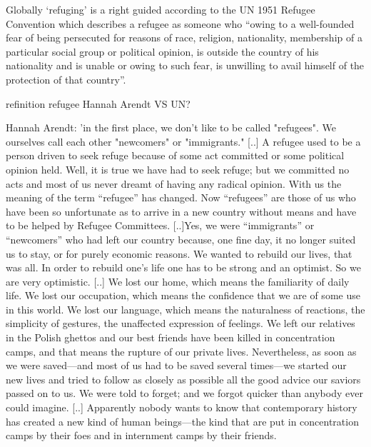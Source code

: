 Globally ‘refuging’ is a right guided according to the UN
1951 Refugee Convention which describes a refugee as
someone who “owing to a well-founded fear of being
persecuted for reasons of race, religion, nationality,
membership of a particular social group or political
opinion, is outside the country of his nationality and is
unable or owing to such fear, is unwilling to avail himself
of the protection of that country”.


refinition refugee Hannah Arendt VS UN?

Hannah Arendt: 'in the first place, we don't like to be called "refugees". We ourselves call each other "newcomers" or "immigrants." [..] A refugee used to be a person driven to seek refuge because of some act committed or some political opinion held. Well, it is true we have had to seek refuge; but we committed no acts and most of us never dreamt of having any radical opinion. With us the meaning of the term “refugee” has changed. Now “refugees” are those of us who have been so unfortunate as to arrive in a new country without means and have to be helped by Refugee Committees.
[..]Yes, we were “immigrants” or “newcomers” who had left our country because, one fine day, it no longer suited us to stay, or for purely economic reasons. We wanted to rebuild our lives, that was all. In order to rebuild one’s life one has to be strong and an optimist. So we are very optimistic. [..]
We lost our home, which means the familiarity of daily life. We lost our occupation, which means the confidence that we are of some use in this world. We lost our language, which means the naturalness of reactions, the simplicity of gestures, the unaffected expression of feelings. We left our relatives in the Polish ghettos and our best friends have been killed in concentration camps, and that means the rupture of our private lives.
Nevertheless, as soon as we were saved—and most of us had to be saved several times—we started our new lives and tried to follow as closely as possible all the good advice our saviors passed on to us. We were told to forget; and we forgot quicker than anybody ever could imagine.
[..] Apparently nobody wants to know that contemporary history has created a new kind of human beings—the kind that are put in concentration camps by their foes and in internment camps by their friends.

